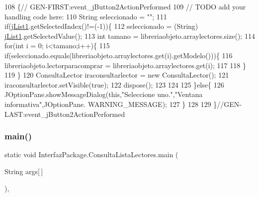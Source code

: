 \begin{DoxyCode}
108                                                                          \{\textcolor{comment}{//
      GEN-FIRST:event\_jButton2ActionPerformed}
109         \textcolor{comment}{// TODO add your handling code here:}
110         String seleccionado = \textcolor{stringliteral}{""};
111         \textcolor{keywordflow}{if}(\mbox{\hyperlink{class_interfaz_package_1_1_consulta_lista_lectores_adfbed0d9d2c73d12354e8e7d39d3d074}{jList1}}.getSelectedIndex()!=(-1))\{
112             seleccionado = (String) \mbox{\hyperlink{class_interfaz_package_1_1_consulta_lista_lectores_adfbed0d9d2c73d12354e8e7d39d3d074}{jList1}}.getSelectedValue();
113             \textcolor{keywordtype}{int} tamano = libreriaobjeto.arraylectores.size();
114         \textcolor{keywordflow}{for}(\textcolor{keywordtype}{int} i = 0; i<tamano;i++)\{
115             \textcolor{keywordflow}{if}(seleccionado.equals(libreriaobjeto.arraylectores.get(i).getModelo()))\{
116                 libreriaobjeto.lectorparacomprar = libreriaobjeto.arraylectores.get(i);
117                 
118             \}
119         \}
120                 ConsultaLector iraconsultarlector = \textcolor{keyword}{new} ConsultaLector();
121                 iraconsultarlector.setVisible(\textcolor{keyword}{true});
122                 dispose();
123                 
124                 
125         \}\textcolor{keywordflow}{else}\{
126             JOptionPane.showMessageDialog(\textcolor{keyword}{this},\textcolor{stringliteral}{"Seleccione uno."},\textcolor{stringliteral}{"Ventana informativa"},JOptionPane.
      WARNING\_MESSAGE);
127         \}
128         
129     \}\textcolor{comment}{//GEN-LAST:event\_jButton2ActionPerformed}
\end{DoxyCode}
\mbox{\label{class_interfaz_package_1_1_consulta_lista_lectores_abda247dfb07cabb8854bdbd8d033f89e}} 
\subsubsection{\texorpdfstring{main()}{main()}}
{\footnotesize\ttfamily static void Interfaz\+Package.\+Consulta\+Lista\+Lectores.\+main (\begin{DoxyParamCaption}\item[{String}]{args\mbox{[}$\,$\mbox{]} }\end{DoxyParamCaption})\hspace{0.3cm}{\ttfamily [inline]}, {\ttfamily [static]}}


